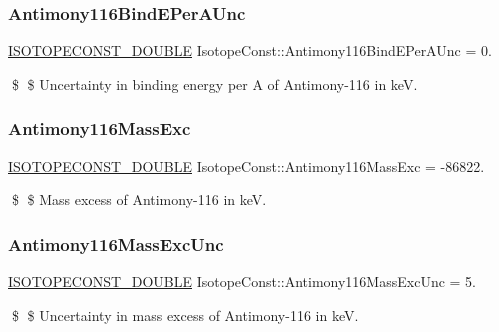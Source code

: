 \subsubsection{\texorpdfstring{Antimony116\+Bind\+E\+Per\+A\+Unc}{Antimony116BindEPerAUnc}}
{\footnotesize\ttfamily \mbox{\hyperlink{group___isotope_const-_macros_ga8f45a7272ce02c0b4c65c44636ed719a}{I\+S\+O\+T\+O\+P\+E\+C\+O\+N\+S\+T\+\_\+\+D\+O\+U\+B\+LE}} Isotope\+Const\+::\+Antimony116\+Bind\+E\+Per\+A\+Unc = 0.}

\$ \$ Uncertainty in binding energy per A of Antimony-\/116 in keV. \mbox{\label{group___isotope_const-_antimony-_sb116_ga88545ce3a34b9378576493173e16f672}} 
\subsubsection{\texorpdfstring{Antimony116\+Mass\+Exc}{Antimony116MassExc}}
{\footnotesize\ttfamily \mbox{\hyperlink{group___isotope_const-_macros_ga8f45a7272ce02c0b4c65c44636ed719a}{I\+S\+O\+T\+O\+P\+E\+C\+O\+N\+S\+T\+\_\+\+D\+O\+U\+B\+LE}} Isotope\+Const\+::\+Antimony116\+Mass\+Exc = -\/86822.}

\$ \$ Mass excess of Antimony-\/116 in keV. \mbox{\label{group___isotope_const-_antimony-_sb116_gab176827af66afc83d036b7ded9f62ac6}} 
\subsubsection{\texorpdfstring{Antimony116\+Mass\+Exc\+Unc}{Antimony116MassExcUnc}}
{\footnotesize\ttfamily \mbox{\hyperlink{group___isotope_const-_macros_ga8f45a7272ce02c0b4c65c44636ed719a}{I\+S\+O\+T\+O\+P\+E\+C\+O\+N\+S\+T\+\_\+\+D\+O\+U\+B\+LE}} Isotope\+Const\+::\+Antimony116\+Mass\+Exc\+Unc = 5.}

\$ \$ Uncertainty in mass excess of Antimony-\/116 in keV. \mbox{\label{group___isotope_const-_antimony-_sb116_ga26f2fa926cae1e747d7b46efa9c37237}} 
